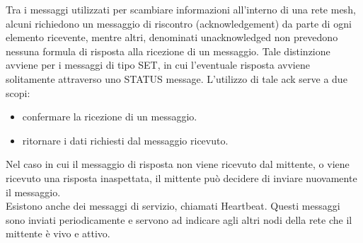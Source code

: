 \noindent Tra i messaggi utilizzati per scambiare informazioni all'interno di una rete mesh, alcuni richiedono un messaggio di riscontro (acknowledgement) da parte di ogni elemento ricevente, mentre altri, denominati unacknowledged non prevedono nessuna formula di risposta alla ricezione di un messaggio. Tale distinzione avviene per i messaggi di tipo SET, in cui l'eventuale risposta avviene  solitamente attraverso uno STATUS message. L'utilizzo di tale ack serve a due scopi:
\begin{itemize}
    \item confermare la ricezione di un messaggio.
    \item ritornare i dati richiesti dal messaggio ricevuto.
\end{itemize}

\noindent Nel caso in cui il messaggio di risposta non viene ricevuto dal mittente, o viene ricevuto una risposta inaspettata, il mittente può decidere di inviare nuovamente il messaggio.\\

\noindent Esistono anche dei messaggi di servizio, chiamati Heartbeat. Questi messaggi sono inviati periodicamente e servono ad indicare agli altri nodi della rete che il mittente è vivo e attivo.


